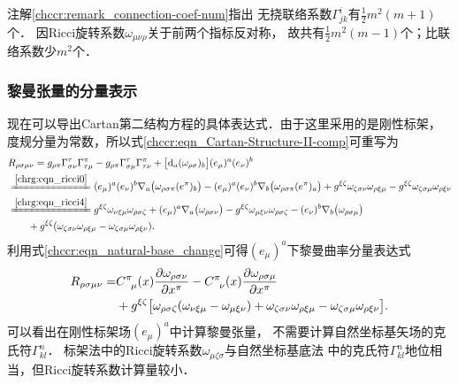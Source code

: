 \begin{remark}\label{chrg:remark_ricci-coef-num}
    注解\ref{chccr:remark_connection-coef-num}指出
    无挠联络系数$\Gamma^{i}_{jk}$有$\frac{1}{2}m^2(m+1)$个．
    因Ricci旋转系数$\omega_{\mu\nu\rho}$关于前两个指标反对称，
    故共有$\frac{1}{2}m^2(m-1)$个；比联络系数少$m^2$个．
\end{remark}


\subsubsection{黎曼张量的分量表示}\label{chrg:sec_Riemann_rr}
现在可以导出Cartan第二结构方程的具体表达式．由于这里采用的是{\kaishu 刚性}标架，
度规分量为常数，所以式\eqref{chccr:eqn_Cartan-Structure-II-comp}可重写为
\setlength{\mathindent}{0em}
\begin{align*}
    &R_{\rho\sigma\mu\nu} = g_{\rho\pi} \Gamma _{\sigma \nu}^\tau \Gamma _{\tau\mu}^\pi
      - g_{\rho\pi}\Gamma _{\sigma \mu}^\tau \Gamma_{\tau\nu}^\pi +
      \bigl[{\rm d}_a (\omega_{\rho \sigma} )_b \bigr] (e_\mu)^a (e_\nu)^b     \\
     &\xlongequal{\ref{chrg:eqn_ricci0}} 
      (e_\mu)^a (e_\nu)^b \nabla_a\bigl(\omega_{\rho\sigma\pi} (e^\pi)_{b}\bigr) -
      (e_\mu)^a (e_\nu)^b \nabla_b \bigl(\omega_{\rho\sigma\pi} (e^\pi)_{a}  \bigr)
      + g^{\xi\zeta} \omega _{\zeta\sigma\nu} \omega _{\rho\xi\mu}
      -g^{\xi\zeta} \omega _{\zeta\sigma\mu} \omega _{\rho\xi\nu}  \\
     &\xlongequal{\ref{chrg:eqn_ricci4}} 
       g^{\xi\zeta}\omega_{\nu\xi\mu}\omega_{\rho\sigma\zeta}
      +(e_\mu)^a \nabla_a\bigl(\omega_{\rho\sigma\nu} \bigr)
      - g^{\xi\zeta}\omega_{\mu\xi\nu}\omega_{\rho\sigma\zeta}
      -(e_\nu)^b \nabla_b \bigl(\omega_{\rho\sigma\mu} \bigr)   \\
    &{\qquad} + g^{\xi\zeta} (\omega _{\zeta\sigma\nu} \omega _{\rho\xi\mu}
      - \omega _{\zeta\sigma\mu} \omega _{\rho\xi\nu}) .
\end{align*}\setlength{\mathindent}{2em}
利用式\eqref{chccr:eqn_natural-base_change}可得$(e_\mu)^a$下黎曼曲率分量表达式
\begin{equation}\label{chrg:eqn_Riemann_rr}
\begin{aligned}
   R_{\rho\sigma\mu\nu} =&
    C_{\hphantom{\pi} \mu}^{\pi}(x) \frac{\partial \omega_{\rho\sigma\nu}}{\partial x^\pi}
   -C_{\hphantom{\pi} \nu}^{\pi}(x) \frac{\partial \omega_{\rho\sigma\mu}}{\partial x^\pi} \\
   & + g^{\xi\zeta} \bigl[ \omega_{\rho\sigma\zeta} (\omega_{\nu\xi\mu}
   -\omega_{\mu\xi\nu}  ) + \omega _{\zeta\sigma\nu} \omega _{\rho\xi\mu}
   - \omega _{\zeta\sigma\mu} \omega _{\rho\xi\nu} \bigr] .
\end{aligned}
\end{equation}
可以看出在{\kaishu 刚性}标架场$(e_\mu)^{a}$中计算黎曼张量，
不需要计算自然坐标基矢场的克氏符$\Gamma^n _{kl}$．
标架法中的Ricci旋转系数$\omega _{\mu\zeta\sigma}$与自然坐标基底法
中的克氏符$\Gamma^n _{kl}$地位相当，但Ricci旋转系数计算量较小．


